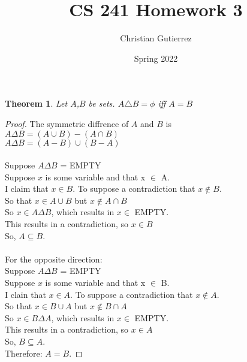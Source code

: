 \documentclass{article}
\title{CS 241 Homework 3}
\author{Christian Gutierrez}
\date{Spring 2022}
\newtheorem{theorem}{Theorem}
\begin{document}
\maketitle

\newpage
\begin{theorem}
    Let $A$,$B$ be sets. $A \triangle B = \phi$ iff $A = B$
\end{theorem}
\begin{proof}
    The symmetric diffrence of $A$ and $B$ is \\
    $A \Delta B = (A \cup B)-(A \cap B)$ \\
    $A \Delta B = (A - B) \cup (B - A)$ \\  \\
    Suppose $A \Delta B$ = EMPTY \\
    Suppose $x$ is some variable and that x $\in$ A.\\
    I claim that $x \in B$. To suppose a contradiction that $x \not\in B$.\\
    So that $x \in A \cup B$ but $x \notin A \cap B$ \\
    So $x \in A \Delta B$, which results in $x \in$ EMPTY. \\
    This results in a contradiction, so $x \in B$ \\
    So, $A \subseteq B$.\\ \\
    For the opposite direction:\\
    Suppose $A \Delta B$ = EMPTY \\
    Suppose $x$ is some variable and that x $\in$ B.\\
    I clain that $x \in A$. To suppose a contradiction that $x \not\in A$.\\
    So that $x \in B \cup A$ but $x \notin B \cap A$ \\
    So $x \in B \Delta A$, which results in $x \in$ EMPTY. \\
    This results in a contradiction, so $x \in A$ \\
    So, $B \subseteq A$. \\

    Therefore: $A = B$.
\end{proof} \newpage
\end{document}
